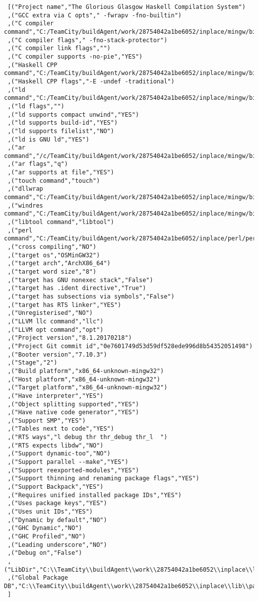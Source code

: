\begin{verbatim}
 [("Project name","The Glorious Glasgow Haskell Compilation System")
 ,("GCC extra via C opts"," -fwrapv -fno-builtin")
 ,("C compiler command","C:/TeamCity/buildAgent/work/28754042a1be6052/inplace/mingw/bin/gcc.exe")
 ,("C compiler flags"," -fno-stack-protector")
 ,("C compiler link flags","")
 ,("C compiler supports -no-pie","YES")
 ,("Haskell CPP command","C:/TeamCity/buildAgent/work/28754042a1be6052/inplace/mingw/bin/gcc.exe")
 ,("Haskell CPP flags","-E -undef -traditional")
 ,("ld command","C:/TeamCity/buildAgent/work/28754042a1be6052/inplace/mingw/bin/ld.exe")
 ,("ld flags","")
 ,("ld supports compact unwind","YES")
 ,("ld supports build-id","YES")
 ,("ld supports filelist","NO")
 ,("ld is GNU ld","YES")
 ,("ar command","/c/TeamCity/buildAgent/work/28754042a1be6052/inplace/mingw/bin/ar")
 ,("ar flags","q")
 ,("ar supports at file","YES")
 ,("touch command","touch")
 ,("dllwrap command","C:/TeamCity/buildAgent/work/28754042a1be6052/inplace/mingw/bin/dllwrap.exe")
 ,("windres command","C:/TeamCity/buildAgent/work/28754042a1be6052/inplace/mingw/bin/windres.exe")
 ,("libtool command","libtool")
 ,("perl command","C:/TeamCity/buildAgent/work/28754042a1be6052/inplace/perl/perl")
 ,("cross compiling","NO")
 ,("target os","OSMinGW32")
 ,("target arch","ArchX86_64")
 ,("target word size","8")
 ,("target has GNU nonexec stack","False")
 ,("target has .ident directive","True")
 ,("target has subsections via symbols","False")
 ,("target has RTS linker","YES")
 ,("Unregisterised","NO")
 ,("LLVM llc command","llc")
 ,("LLVM opt command","opt")
 ,("Project version","8.1.20170218")
 ,("Project Git commit id","0e7601749d53d59df528ede996d8b54352051498")
 ,("Booter version","7.10.3")
 ,("Stage","2")
 ,("Build platform","x86_64-unknown-mingw32")
 ,("Host platform","x86_64-unknown-mingw32")
 ,("Target platform","x86_64-unknown-mingw32")
 ,("Have interpreter","YES")
 ,("Object splitting supported","YES")
 ,("Have native code generator","YES")
 ,("Support SMP","YES")
 ,("Tables next to code","YES")
 ,("RTS ways","l debug thr thr_debug thr_l  ")
 ,("RTS expects libdw","NO")
 ,("Support dynamic-too","NO")
 ,("Support parallel --make","YES")
 ,("Support reexported-modules","YES")
 ,("Support thinning and renaming package flags","YES")
 ,("Support Backpack","YES")
 ,("Requires unified installed package IDs","YES")
 ,("Uses package keys","YES")
 ,("Uses unit IDs","YES")
 ,("Dynamic by default","NO")
 ,("GHC Dynamic","NO")
 ,("GHC Profiled","NO")
 ,("Leading underscore","NO")
 ,("Debug on","False")
 ,("LibDir","C:\\TeamCity\\buildAgent\\work\\28754042a1be6052\\inplace\\lib")
 ,("Global Package DB","C:\\TeamCity\\buildAgent\\work\\28754042a1be6052\\inplace\\lib\\package.conf.d")
 ]
\end{verbatim}
